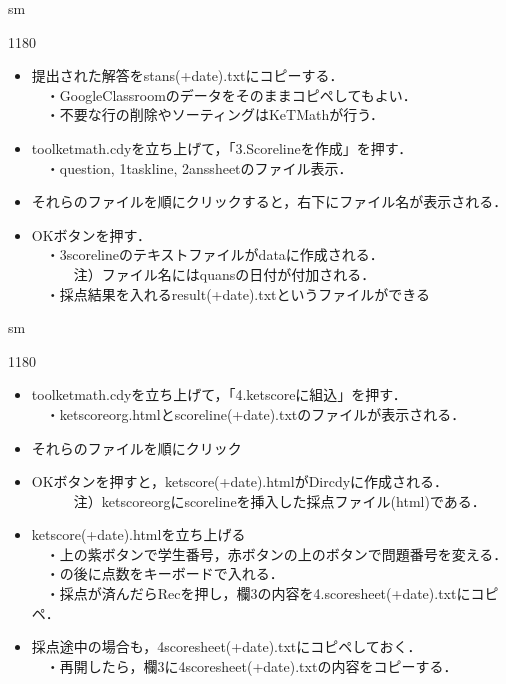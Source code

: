 \documentclass[landscape,10pt]{ujarticle}
\newcommand{\slidepage}[1][s]{%
\setcounter{ketpicctra}{18}%
\if#1m \setcounter{ketpicctra}{1}\fi
\hypersetup{linkcolor=black}%

\begin{layer}{118}{0}
\putnotee{122}{-\theketpicctra.05}{\small\thepage/\pageref{pageend}}
\end{layer}\hypersetup{linkcolor=blue}

}
\begin{document}


\vspace*{18mm}

\slidepage
\begin{itemize}
\item
提出された解答をstans(+date).txtにコピーする．\\
　・GoogleClassroomのデータをそのままコピペしてもよい．\\
　・不要な行の削除やソーティングはKeTMathが行う．
\item
toolketmath.cdyを立ち上げて，「3.Scorelineを作成」を押す．\\
　・question, 1taskline, 2anssheetのファイル表示．
\item
それらのファイルを順にクリックすると，右下にファイル名が表示される．
\item
OKボタンを押す．\\
　・3scorelineのテキストファイルがdataに作成される．\\
　　　注）ファイル名にはquansの日付が付加される．\\
　・採点結果を入れるresult(+date).txtというファイルができる
\end{itemize}



\vspace*{18mm}

\slidepage
\begin{itemize}
\item
toolketmath.cdyを立ち上げて，「4.ketscoreに組込」を押す．\\
　・ketscoreorg.htmlとscoreline(+date).txtのファイルが表示される．
\item
それらのファイルを順にクリック
\item
OKボタンを押すと，ketscore(+date).htmlがDircdyに作成される．\\
　　　注）ketscoreorgにscorelineを挿入した採点ファイル(html)である．
\item
ketscore(+date).htmlを立ち上げる\\
　・上の紫ボタンで学生番号，赤ボタンの上のボタンで問題番号を変える．\\
　・\dc の後に点数をキーボードで入れる．\\
　・採点が済んだらRecを押し，欄3の内容を4.scoresheet(+date).txtにコピペ．
\item
採点途中の場合も，4scoresheet(+date).txtにコピペしておく．\\
　・再開したら，欄3に4scoresheet(+date).txtの内容をコピーする．
\end{itemize}
\end{document}
